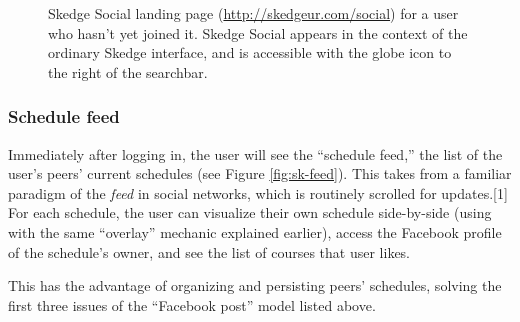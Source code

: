   \begin{figure}[H]
      \centering
      \caption[Skedge Social landing page for a user who hasn't yet joined it]{Skedge Social landing page (\url{http://skedgeur.com/social}) for a user who hasn't yet joined it. Skedge Social appears in the context of the ordinary Skedge interface, and is accessible with the globe icon to the right of the searchbar.} \label{fig:sk-social-login}
    \end{figure}

  \subsubsection{Schedule feed}

  Immediately after logging in, the user will see the ``schedule feed,'' the list of the user's peers' current schedules (see Figure \ref{fig:sk-feed}). This takes from a familiar paradigm of the \emph{feed} in social networks, which is routinely scrolled for updates.[1] For each schedule, the user can visualize their own schedule side-by-side (using with the same ``overlay'' mechanic explained earlier), access the Facebook profile of the schedule's owner, and see the list of courses that user likes.

  This has the advantage of organizing and persisting peers' schedules, solving the first three issues of the ``Facebook post'' model listed above.
      
